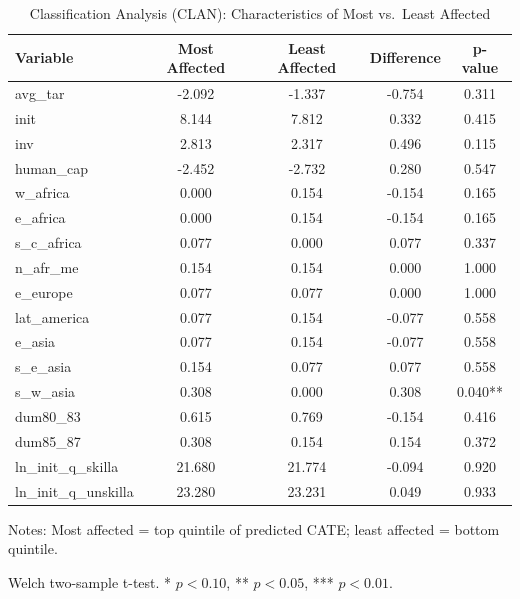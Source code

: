 \begin{table}[h]
\centering
\caption{Classification Analysis (CLAN): Characteristics of Most vs.\ Least Affected}
\small
\begin{tabular}{lcccc}
\toprule
Variable & Most Affected & Least Affected & Difference & p-value \\
\midrule
avg\_tar & -2.092 & -1.337 & -0.754 & 0.311 \\
init & 8.144 & 7.812 & 0.332 & 0.415 \\
inv & 2.813 & 2.317 & 0.496 & 0.115 \\
human\_cap & -2.452 & -2.732 & 0.280 & 0.547 \\
w\_africa & 0.000 & 0.154 & -0.154 & 0.165 \\
e\_africa & 0.000 & 0.154 & -0.154 & 0.165 \\
s\_c\_africa & 0.077 & 0.000 & 0.077 & 0.337 \\
n\_afr\_me & 0.154 & 0.154 & 0.000 & 1.000 \\
e\_europe & 0.077 & 0.077 & 0.000 & 1.000 \\
lat\_america & 0.077 & 0.154 & -0.077 & 0.558 \\
e\_asia & 0.077 & 0.154 & -0.077 & 0.558 \\
s\_e\_asia & 0.154 & 0.077 & 0.077 & 0.558 \\
s\_w\_asia & 0.308 & 0.000 & 0.308 & 0.040** \\
dum80\_83 & 0.615 & 0.769 & -0.154 & 0.416 \\
dum85\_87 & 0.308 & 0.154 & 0.154 & 0.372 \\
ln\_init\_q\_skilla & 21.680 & 21.774 & -0.094 & 0.920 \\
ln\_init\_q\_unskilla & 23.280 & 23.231 & 0.049 & 0.933 \\
\bottomrule
\end{tabular}
\begin{tablenotes}
\small
\item Notes: Most affected = top quintile of predicted CATE; least affected = bottom quintile.
\item Welch two-sample t-test. * $p<0.10$, ** $p<0.05$, *** $p<0.01$.
\end{tablenotes}
\end{table}